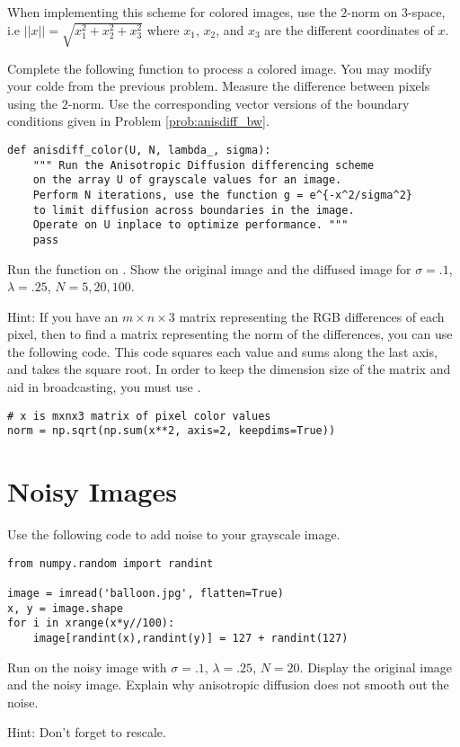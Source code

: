 When implementing this scheme for colored images, use the $2$-norm on 3-space, i.e $||x||=\sqrt{x_1^2+x_2^2+x_3^2}$ where $x_1$, $x_2$, and $x_3$ are the different coordinates of $x$.

\begin{problem}
Complete the following function to process a colored image.
You may modify your colde from the previous problem.
Measure the difference between pixels using the $2$-norm.
Use the corresponding vector versions of the boundary conditions given in Problem \ref{prob:anisdiff_bw}.

\begin{lstlisting}
def anisdiff_color(U, N, lambda_, sigma):
    """ Run the Anisotropic Diffusion differencing scheme
    on the array U of grayscale values for an image.
    Perform N iterations, use the function g = e^{-x^2/sigma^2}
    to limit diffusion across boundaries in the image.
    Operate on U inplace to optimize performance. """
    pass
\end{lstlisting}
Run the function on .
Show the original image and the diffused image for $\sigma = .1$, $\lambda = .25$, $N = 5, 20, 100$.

Hint: If you have an $m \times n \times 3$ matrix representing the RGB differences of each pixel, then to find a matrix representing the norm of the differences, you can use the following code.
This code squares each value and sums along the last axis, and takes the square root.
In order to keep the dimension size of the matrix and aid in broadcasting, you must use .

\begin{lstlisting}
# x is mxnx3 matrix of pixel color values
norm = np.sqrt(np.sum(x**2, axis=2, keepdims=True))
\end{lstlisting}

\end{problem}

\newpage
\section*{Noisy Images}

\begin{problem}
Use the following code to add noise to your grayscale image.

\begin{lstlisting}
from numpy.random import randint

image = imread('balloon.jpg', flatten=True)
x, y = image.shape
for i in xrange(x*y//100):
	image[randint(x),randint(y)] = 127 + randint(127)
\end{lstlisting}

Run  on the noisy image with $\sigma=.1$, $\lambda=.25$, $N=20$.
Display the original image and the noisy image.
Explain why anisotropic diffusion does not smooth out the noise.

Hint: Don't forget to rescale.
\end{problem}


